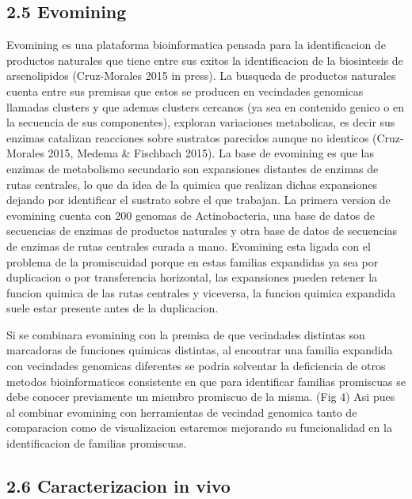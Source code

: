 \documentclass[12pt,twoside]{reedthesis}
\begin{document}
  \subsection{2.5 Evomining}\label{evomining}
  
  Evomining es una plataforma bioinformatica pensada para la
  identificacion de productos naturales que tiene entre sus exitos la
  identificacion de la biosintesis de arsenolipidos (Cruz-Morales 2015 in
  press). La busqueda de productos naturales cuenta entre sus premisas que
  estos se producen en vecindades genomicas llamadas clusters y que ademas
  clusters cercanos (ya sea en contenido genico o en la secuencia de sus
  componentes), exploran variaciones metabolicas, es decir sus enzimas
  catalizan reacciones sobre sustratos parecidos aunque no identicos
  (Cruz-Morales 2015, Medema \& Fischbach 2015). La base de evomining es
  que las enzimas de metabolismo secundario son expansiones distantes de
  enzimas de rutas centrales, lo que da idea de la quimica que realizan
  dichas expansiones dejando por identificar el sustrato sobre el que
  trabajan. La primera version de evomining cuenta con 200 genomas de
  Actinobacteria, una base de datos de secuencias de enzimas de productos
  naturales y otra base de datos de secuencias de enzimas de rutas
  centrales curada a mano. Evomining esta ligada con el problema de la
  promiscuidad porque en estas familias expandidas ya sea por duplicacion
  o por transferencia horizontal, las expansiones pueden retener la
  funcion quimica de las rutas centrales y viceversa, la funcion quimica
  expandida suele estar presente antes de la duplicacion.
  
  Si se combinara evomining con la premisa de que vecindades distintas son
  marcadoras de funciones quimicas distintas, al encontrar una familia
  expandida con vecindades genomicas diferentes se podria solventar la
  deficiencia de otros metodos bioinformaticos consistente en que para
  identificar familias promiscuas se debe conocer previamente un miembro
  promiscuo de la misma. (Fig 4) Asi pues al combinar evomining con
  herramientas de vecindad genomica tanto de comparacion como de
  visualizacion estaremos mejorando su funcionalidad en la identificacion
  de familias promiscuas.
  
  \subsection{2.6 Caracterizacion in vivo}\label{caracterizacion-in-vivo}
  
\end{document}
